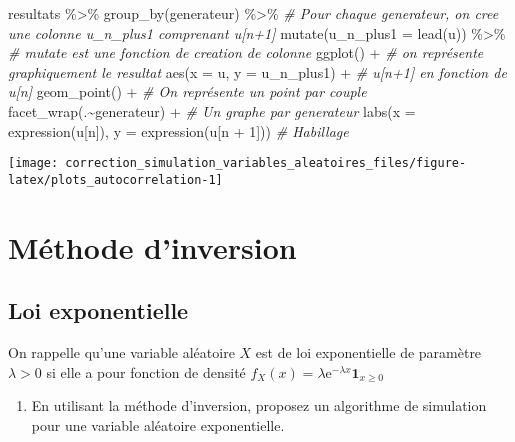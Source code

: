 \documentclass[
]{article}
\newenvironment{Shaded}{\begin{snugshade}}{\end{snugshade}}
\newcommand{\AttributeTok}[1]{\textcolor[rgb]{0.77,0.63,0.00}{#1}}
\newcommand{\CommentTok}[1]{\textcolor[rgb]{0.56,0.35,0.01}{\textit{#1}}}
\newcommand{\DecValTok}[1]{\textcolor[rgb]{0.00,0.00,0.81}{#1}}
\newcommand{\FunctionTok}[1]{\textcolor[rgb]{0.00,0.00,0.00}{#1}}
\newcommand{\NormalTok}[1]{#1}
\newcommand{\SpecialCharTok}[1]{\textcolor[rgb]{0.00,0.00,0.00}{#1}}
\providecommand{\tightlist}{%
  \setlength{\itemsep}{0pt}\setlength{\parskip}{0pt}}
\begin{document}
\begin{Shaded}
\begin{Highlighting}[]
\NormalTok{resultats }\SpecialCharTok{\%\textgreater{}\%}
  \FunctionTok{group\_by}\NormalTok{(generateur) }\SpecialCharTok{\%\textgreater{}\%}
  \CommentTok{\# Pour chaque generateur, on cree une colonne u\_n\_plus1  comprenant u[n+1]}
  \FunctionTok{mutate}\NormalTok{(}\AttributeTok{u\_n\_plus1 =} \FunctionTok{lead}\NormalTok{(u)) }\SpecialCharTok{\%\textgreater{}\%} \CommentTok{\# mutate est une fonction de creation de colonne}
  \FunctionTok{ggplot}\NormalTok{() }\SpecialCharTok{+} \CommentTok{\# on représente graphiquement le resultat}
  \FunctionTok{aes}\NormalTok{(}\AttributeTok{x =}\NormalTok{ u, }\AttributeTok{y =}\NormalTok{ u\_n\_plus1) }\SpecialCharTok{+} \CommentTok{\# u[n+1] en fonction de u[n]}
  \FunctionTok{geom\_point}\NormalTok{() }\SpecialCharTok{+} \CommentTok{\# On représente un point par couple}
  \FunctionTok{facet\_wrap}\NormalTok{(.}\SpecialCharTok{\textasciitilde{}}\NormalTok{generateur) }\SpecialCharTok{+} \CommentTok{\# Un graphe par generateur}
  \FunctionTok{labs}\NormalTok{(}\AttributeTok{x =} \FunctionTok{expression}\NormalTok{(u[n]), }\AttributeTok{y =} \FunctionTok{expression}\NormalTok{(u[n }\SpecialCharTok{+} \DecValTok{1}\NormalTok{])) }\CommentTok{\# Habillage}
\end{Highlighting}
\end{Shaded}

\begin{center}\texttt{[image: correction\_simulation\_variables\_aleatoires\_files/figure-latex/plots\_autocorrelation-1]} \end{center}

\hypertarget{muxe9thode-dinversion}{%
\section{Méthode d'inversion}\label{muxe9thode-dinversion}}

\hypertarget{loi-exponentielle}{%
\subsection{Loi exponentielle}\label{loi-exponentielle}}

On rappelle qu'une variable aléatoire \(X\) est de loi exponentielle de
paramètre \(\lambda > 0\) si elle a pour fonction de densité
\(f_X(x) = \lambda\text{e}^{-\lambda x} \mathbf{1}_{x\geq0}\)

\begin{enumerate}
\def\labelenumi{\arabic{enumi}.}
\tightlist
\item
  En utilisant la méthode d'inversion, proposez un algorithme de
  simulation pour une variable aléatoire exponentielle.
\end{enumerate}
\end{document}
